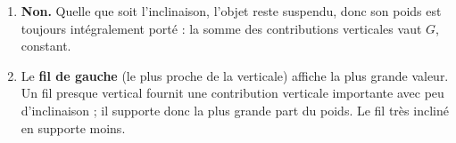 \documentclass[11pt,a4paper]{article}
\begin{document}
\begin{corrige}
\begin{enumerate}[label=\alph*)]
  \item \textbf{Non.} Quelle que soit l'inclinaison, l'objet reste suspendu, donc son poids est
        toujours intégralement porté : la somme des contributions verticales vaut $G$, constant.
  \item Le \textbf{fil de gauche} (le plus proche de la verticale) affiche la plus grande valeur. Un fil
        presque vertical fournit une contribution verticale importante avec peu d'inclinaison ; il
        supporte donc la plus grande part du poids. Le fil très incliné en supporte moins.
\end{enumerate}
\end{corrige}
\end{document}
